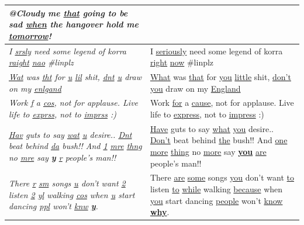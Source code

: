 \documentclass[a4paper,onesided,12pt]{report}
\begin{document}
\begin{table}[hbp]
\begin{tabular}{|>{\itshape}p{7cm}|p{7cm}|}
@Cloudy me \underline{that} going to be sad \underline{when} the hangover hold me \underline{tomorrow}! \\
\hline
I \underline{srsly} need some legend of korra \underline{raight} \underline{nao} \#linplz &
I \underline{seriously} need some legend of korra \underline{right} \underline{now} \#linplz \\
\hline
\underline{Wat} was \underline{tht} for \underline{u} \underline{lil} shit, \underline{dnt} \underline{u} draw on my \underline{enlgand} &
\underline{What} was \underline{that} for \underline{you} \underline{little} shit, \underline{don’t} \underline{you} draw on my \underline{England} \\ \hline
Work \underline{f} a \underline{cos}, not for applause. Live life to \underline{exprss}, not to \underline{imprss} :) & Work \underline{for} a \underline{cause}, not for applause. Live life to \underline{express}, not to \underline{impress} :) \\ \hline
\underline{Hav} guts to say \underline{wat} \underline{u} desire.. \underline{Dnt} beat behind \underline{da} bush!! And \underline{1} \underline{mre} \underline{thng} no \underline{mre} say \textbf{\underline{y}} \underline{r} people's man!! &
\underline{Have} guts to say \underline{what} \underline{you} desire.. \underline{Don’t} beat behind \underline{the} bush!! And \underline{one} \underline{more} \underline{thing} no \underline{more} say \textbf{\underline{you}} \underline{are} people's man!! \\
\hline
There \underline{r} \underline{sm} songs \underline{u} don't want \underline{2} listen \underline{2} \underline{yl} walking \underline{cos} when \underline{u} start dancing \underline{ppl} won't \underline{knw} \textbf{\underline{y}}. &
There \underline{are} \underline{some} songs \underline{you} don't want \underline{to} listen \underline{to} \underline{while} walking \underline{because} when \underline{you} start dancing \underline{people} won't \underline{know} \textbf{\underline{why}}. \\
\hline
\end{tabular}
\end{table}
\end{document}
